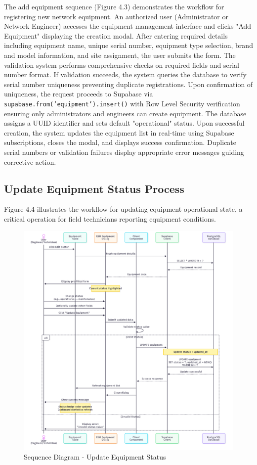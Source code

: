The add equipment sequence (Figure 4.3) demonstrates the workflow for registering new network equipment. An authorized user (Administrator or Network Engineer) accesses the equipment management interface and clicks "Add Equipment" displaying the creation modal. After entering required details including equipment name, unique serial number, equipment type selection, brand and model information, and site assignment, the user submits the form. The validation system performs comprehensive checks on required fields and serial number format. If validation succeeds, the system queries the database to verify serial number uniqueness preventing duplicate registrations. Upon confirmation of uniqueness, the request proceeds to Supabase via \texttt{supabase.from('equipment').insert()} with Row Level Security verification ensuring only administrators and engineers can create equipment. The database assigns a UUID identifier and sets default "operational" status. Upon successful creation, the system updates the equipment list in real-time using Supabase subscriptions, closes the modal, and displays success confirmation. Duplicate serial numbers or validation failures display appropriate error messages guiding corrective action.

\subsection{Update Equipment Status Process}

Figure 4.4 illustrates the workflow for updating equipment operational state, a critical operation for field technicians reporting equipment conditions.

\begin{figure}[H]
    \centering
    \includegraphics[width=0.95\linewidth]{img/chap_04/edit_equipment_status_sequence.png}
    \caption{Sequence Diagram - Update Equipment Status}
    \label{fig:sequence_edit_status}
\end{figure}

